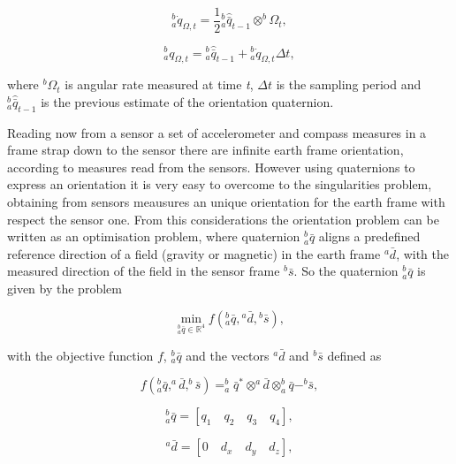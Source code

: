 \begin{equation}
\label{eq4_03}
^b_a \dot{q}_{\Omega,t} = \frac{1}{2} {^b_a \hat{\bar{q}}_{t-1}} \otimes ^b \Omega_t,
\end{equation}

\begin{equation}
\label{eq4_04}
^b_a q_{\Omega,t} = {^b_a \hat{\bar{q}}_{t-1}} + {^b_a \dot{q}_{\Omega,t}} \Delta t,
\end{equation} 

\noindent where $^b \Omega_t$ is angular rate measured at time \textit{t}, $\Delta t$ is the sampling period and $^b_a \hat{\bar{q}}_{t-1}$ is the previous estimate of the orientation quaternion.

Reading now from a sensor a set of accelerometer and compass measures in a frame strap down to the sensor there are infinite earth frame orientation, according to measures read from the sensors. 
However using quaternions to express an orientation it is very easy to overcome to the singularities problem, obtaining from sensors meausures an unique orientation for the earth frame with respect the sensor one.
From this considerations the orientation problem can be written as an optimisation problem, where quaternion $^b_a \bar{q}$ aligns a predefined reference direction of a field (gravity or magnetic) in the earth frame $^a \bar{d}$, with the measured direction of the field in the sensor frame $^b \bar{s}$. So the quaternion $^b_a \bar{q}$ is given by the problem

\begin{equation}
\label{eq4_05}
\min_{{^b_a \bar{q}} \in \mathbb{R}^4} f({^b_a \bar{q}}, {^a \bar{d}}, {^b \bar{s}}),
\end{equation}

\noindent with the objective function $f$, $^b_a \bar{q}$ and the vectors $^a \bar{d}$ and $^b \bar{s}$ defined as 

\begin{equation}
\label{eq4_06}
f(^b_a \bar{q},^a \bar{d}, ^b \bar{s}) = ^b_a \bar{q}^{*} \otimes ^a \bar{d} \otimes ^b_a \bar{q} - ^b \bar{s}, 
\end{equation}

\begin{equation}
\label{eq4_07}
^b_a \bar{q} = [q_1 \quad q_2 \quad q_3 \quad q_4],
\end{equation}

\begin{equation}
\label{eq4_08}
^a \bar{d} = [0 \quad d_x \quad d_y \quad d_z],
\end{equation}

